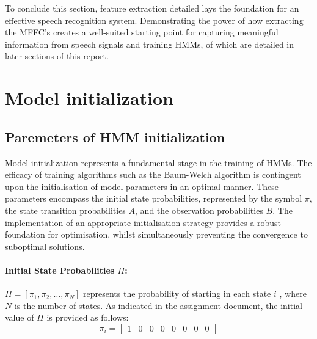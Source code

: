 \documentclass{article}
\begin{document}
To conclude this section, feature extraction detailed lays the foundation for an effective speech recognition system. Demonstrating the power of how extracting the MFFC’s creates a well-suited starting point for capturing meaningful information from speech signals and training HMMs, of which are detailed in later sections of this report. 






\section{Model initialization}


\subsection{Paremeters of HMM initialization}

Model initialization represents a fundamental stage in the training of HMMs. The efficacy of training algorithms such as the Baum-Welch algorithm is contingent upon the initialisation of model parameters in an optimal manner. These parameters encompass the initial state probabilities, represented by the symbol $\pi$, the state transition probabilities $A$, and the observation probabilities $B$. The implementation of an appropriate initialisation strategy provides a robust foundation for optimisation, whilst simultaneously preventing the convergence to suboptimal solutions. 

\paragraph{Initial State Probabilities $\Pi$:}
	 $\Pi = [\pi_1, \pi_2, \dots, \pi_N]$ represents the probability of starting in each state $i$ , where  $N$ is the number of states.
As indicated in the assignment document, the initial value of $\Pi$ is provided as follows:
\begin{equation}
\label{eqn:pi}
\pi_i = \begin{bmatrix}
 	1 & 0 & 0 & 0 & 0 & 0 & 0 & 0
 \end{bmatrix}
\end{equation}
\end{document}
